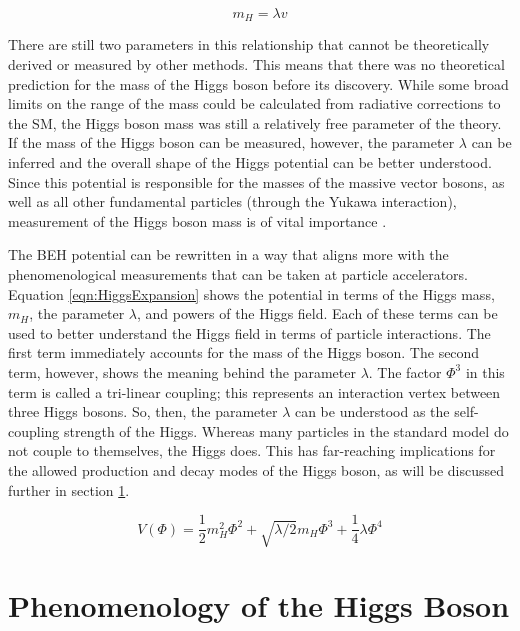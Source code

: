 \documentclass[12pt]{ucsddissertation}
\begin{document}
\begin{equation}\label{eqn:HiggsMass}
    m_H = \lambda v
\end{equation}

There are still two parameters in this relationship that cannot be theoretically derived or measured by other methods. This means that there was no theoretical prediction for the mass of the Higgs boson before its discovery. While some broad limits on the range of the mass could be calculated from radiative corrections to the SM, the Higgs boson mass was still a relatively free parameter of the theory. If the mass of the Higgs boson can be measured, however, the parameter $\lambda$ can be inferred and the overall shape of the Higgs potential can be better understood. Since this potential is responsible for the masses of the massive vector bosons, as well as all other fundamental particles (through the Yukawa interaction), measurement of the Higgs boson mass is of vital importance \cite{CMS10YearReview}.

The BEH potential can be rewritten in a way that aligns more with the phenomenological measurements that can be taken at particle accelerators. Equation \ref{eqn:HiggsExpansion} shows the potential in terms of the Higgs mass, $m_H$, the parameter $\lambda$, and powers of the Higgs field. Each of these terms can be used to better understand the Higgs field in terms of particle interactions. The first term immediately accounts for the mass of the Higgs boson. The second term, however, shows the meaning behind the parameter $\lambda$. The factor $\Phi^3$ in this term is called a tri-linear coupling; this represents an interaction vertex between three Higgs bosons. So, then, the parameter $\lambda$ can be understood as the self-coupling strength of the Higgs. Whereas many particles in the standard model do not couple to themselves, the Higgs does. This has far-reaching implications for the allowed production and decay modes of the Higgs boson, as will be discussed further in section \ref{sec:HiggsModes}.

\begin{equation}\label{eqn:HiggsExpansion}
    V(\Phi) = \frac{1}{2}m^2_H\Phi^2 + \sqrt{\lambda/2}m_H\Phi^3 + \frac{1}{4}\lambda\Phi^4
\end{equation}

\section{Phenomenology of the Higgs Boson}\label{sec:HiggsModes}
\end{document}
